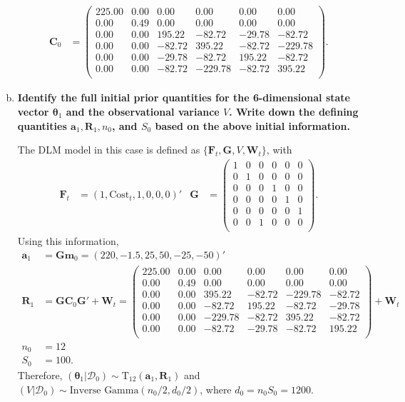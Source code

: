 \documentclass{article}
\newcommand{\sD}{\mathcal{D}}
\newcommand{\bm}{\mathbf{m}}
\newcommand{\bC}{\mathbf{C}}
\newcommand{\btheta}{\boldsymbol{\theta}}
\newcommand{\bF}{\mathbf{F}}
\newcommand{\bG}{\mathbf{G}}
\newcommand{\bW}{\mathbf{W}}
\newcommand{\ba}{\mathbf{a}}
\newcommand{\bR}{\mathbf{R}}
\begin{document}
\begin{enumerate}[(a)]
\begin{align*}
			\bC_0 & = \begin{pmatrix}
			225.00 & 0.00 & 0.00 & 0.00 & 0.00 & 0.00 \\ 
			0.00 & 0.49 & 0.00 & 0.00 & 0.00 & 0.00 \\ 
			0.00 & 0.00 & 195.22 & -82.72 & -29.78 & -82.72 \\ 
			0.00 & 0.00 & -82.72 & 395.22 & -82.72 & -229.78 \\ 
			0.00 & 0.00 & -29.78 & -82.72 & 195.22 & -82.72 \\ 
			0.00 & 0.00 & -82.72 & -229.78 & -82.72 & 395.22 \\ 
			\end{pmatrix}.
		\end{align*}
		
		\item \textbf{Identify the full initial prior quantities for the 6-dimensional state vector $\btheta_1$ and the observational variance $V$. Write down the defining quantities $\ba_1,\bR_1,n_0$, and $S_0$ based on the above initial information.}
		
		The DLM model in this case is defined as $\{ \bF_t, \bG,V,\bW_t \}$, with 
		\begin{align*}
			\bF_t & = (1,\text{Cost}_t,1,0,0,0)' &
			\bG & = \begin{pmatrix}
			1 & 0 & 0 & 0 & 0 & 0 \\
			0 & 1 & 0 & 0 & 0 & 0 \\
			0 & 0 & 0 & 1 & 0 & 0 \\
			0 & 0 & 0 & 0 & 1 & 0 \\
			0 & 0 & 0 & 0 & 0 & 1 \\
			0 & 0 & 1 & 0 & 0 & 0 \\
			\end{pmatrix}.
		\end{align*}
		Using this information,
		\begin{align*}
			\ba_1 & = \bG\bm_0 = (220,  -1.5,  25,  50, -25, -50)' \\
			\bR_1 & = \bG\bC_0\bG' + \bW_t = \begin{pmatrix}
			225.00 & 0.00 & 0.00 & 0.00 & 0.00 & 0.00 \\ 
			0.00 & 0.49 & 0.00 & 0.00 & 0.00 & 0.00 \\ 
			0.00 & 0.00 & 395.22 & -82.72 & -229.78 & -82.72 \\ 
			0.00 & 0.00 & -82.72 & 195.22 & -82.72 & -29.78 \\ 
			0.00 & 0.00 & -229.78 & -82.72 & 395.22 & -82.72 \\ 
			0.00 & 0.00 & -82.72 & -29.78 & -82.72 & 195.22 \\ 
			\end{pmatrix}  + \bW_t\\
			n_0 & = 12 \\
			S_0 & = 100.
		\end{align*}
		Therefore, $(\btheta_1|\sD_0) \sim \text{T}_{12}(\ba_1,\bR_1)$ and $(V|\sD_0) \sim \text{Inverse Gamma}(n_0/2,d_0/2)$, where $d_0 = n_0S_0 = 1200$.
		

\end{enumerate}
\end{document}
